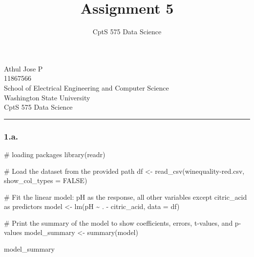 \documentclass[
  12pt,
  letterpaper,
  DIV=11,
  numbers=noendperiod]{scrartcl}
\title{Assignment 5}
\subtitle{CptS 575 Data Science}
\author{}
\date{}
\newenvironment{Shaded}{\begin{snugshade}}{\end{snugshade}}
\newcommand{\AttributeTok}[1]{\textcolor[rgb]{0.40,0.45,0.13}{#1}}
\newcommand{\CommentTok}[1]{\textcolor[rgb]{0.37,0.37,0.37}{#1}}
\newcommand{\ConstantTok}[1]{\textcolor[rgb]{0.56,0.35,0.01}{#1}}
\newcommand{\FunctionTok}[1]{\textcolor[rgb]{0.28,0.35,0.67}{#1}}
\newcommand{\NormalTok}[1]{\textcolor[rgb]{0.00,0.23,0.31}{#1}}
\newcommand{\OtherTok}[1]{\textcolor[rgb]{0.00,0.23,0.31}{#1}}
\newcommand{\SpecialCharTok}[1]{\textcolor[rgb]{0.37,0.37,0.37}{#1}}
\newcommand{\StringTok}[1]{\textcolor[rgb]{0.13,0.47,0.30}{#1}}
\begin{document}
\maketitle


\begin{center}
{\Large Athul Jose P \\ 11867566} \\[0.5cm]
{\large School of Electrical Engineering and Computer Science} \\[0.5cm]
{\large Washington State University} \\[0.5cm]
{\large CptS 575 Data Science} \\[0.5cm]
\end{center}

\begin{center}\rule{0.5\linewidth}{0.5pt}\end{center}

\newpage

\subsubsection{\texorpdfstring{\textbf{1.a.}}{1.a.}}\label{a.}

\begin{Shaded}
\begin{Highlighting}[]
\CommentTok{\# loading packages}
\FunctionTok{library}\NormalTok{(readr)}

\CommentTok{\# Load the dataset from the provided path}
\NormalTok{df }\OtherTok{\textless{}{-}} \FunctionTok{read\_csv}\NormalTok{(}\StringTok{\textquotesingle{}winequality{-}red.csv\textquotesingle{}}\NormalTok{, }\AttributeTok{show\_col\_types =} \ConstantTok{FALSE}\NormalTok{)}

\CommentTok{\# Fit the linear model: pH as the response, all other variables except citric\_acid as predictors}
\NormalTok{model }\OtherTok{\textless{}{-}} \FunctionTok{lm}\NormalTok{(pH }\SpecialCharTok{\textasciitilde{}}\NormalTok{ . }\SpecialCharTok{{-}}\NormalTok{ citric\_acid, }\AttributeTok{data =}\NormalTok{ df)}

\CommentTok{\# Print the summary of the model to show coefficients, errors, t{-}values, and p{-}values}
\NormalTok{model\_summary }\OtherTok{\textless{}{-}} \FunctionTok{summary}\NormalTok{(model)}

\NormalTok{model\_summary}
\end{Highlighting}
\end{Shaded}
\end{document}
